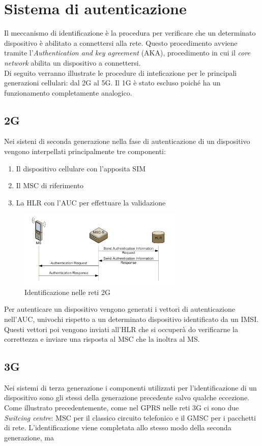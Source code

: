 \section{Sistema di autenticazione}
Il meccanismo di identificazione è la procedura per verificare che un determinato dispositivo
è abilitato a connettersi alla rete.
Questo procedimento avviene tramite l'\textit{Authentication and key agreement} (AKA), procedimento in cui
il \textit{core network} abilita un dispositivo a connettersi.\\
Di seguito verranno illustrate le procedure di inteficazione per le principali generazioni cellulari: dal 2G al 5G. Il 
1G è stato escluso poiché ha un funzionamento completamente analogico.

\subsection{2G}
Nei sisteni di seconda generazione nella fase di autenticazione di un dispositivo vengono interpellati principalmente tre componenti:
\begin{enumerate}
    \item Il dispositivo cellulare con l'apposita SIM
    \item Il MSC di riferimento
    \item La HLR con l'AUC per effettuare la validazione
\end{enumerate}
\begin{figure}[ht]
    \centering
    \includegraphics[width=0.7\textwidth]{images/auth-2g.png}
    \caption{Identificazione nelle reti 2G}
\end{figure}
Per autenticare un dispositivo vengono generati i vettori di autenticazione nell'AUC, univochi rispetto a un determinato dispositivo identificato da 
un IMSI. Questi vettori poi vengono inviati all'HLR che si occuperà do verificarne la correttezza e inviare una risposta al MSC che la inoltra al MS.

\clearpage

\subsection{3G}
Nei sistemi di terza generazione i componenti utilizzati per l'identificazione di un dispositivo sono gli stessi della generazione precedente salvo qualche 
eccezione. Come illustrato precedentemente, come nel GPRS nelle reti 3G ci sono due \textit{Switcing centre}: MSC per il classico circuito telefonico e il GMSC per 
i pacchetti di rete. L'identificazione viene completata allo stesso modo della seconda generazione, ma 

